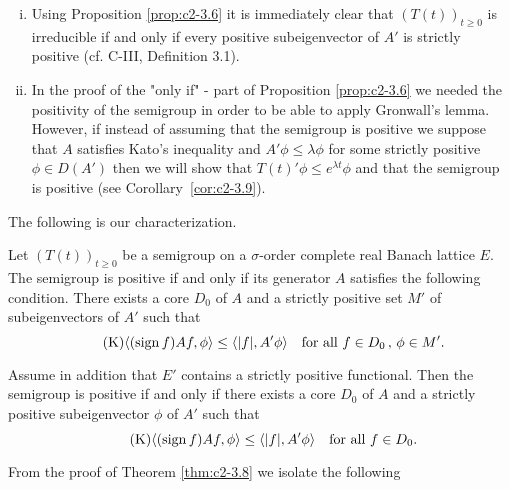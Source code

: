 \begin{remark}\label{rem:c2-3.7}
\begin{enumerate}[(i)]
\item \label{rem:c2-3.7-1}
Using Proposition \ref{prop:c2-3.6} it is immediately clear that
$(T(t))_{t \geq 0}$ is irreducible if and only if every positive subeigenvector
of $A'$ is strictly positive (cf. C-III, Definition 3.1).
\item \label{rem:c2-3.7-2}
In the proof of the "only if" - part of Proposition \ref{prop:c2-3.6} we needed the
positivity of the semigroup in order to be able to apply Gronwall's
lemma.
However, if instead of assuming that the semigroup is positive
we suppose that $A$ satisfies Kato's inequality and $A'\phi \leq \lambda\phi$ for some strictly positive $\phi \in D(A')$ then we will show that $T(t)'\phi \leq
e^{\lambda t} \phi$ and that the semigroup is positive (see Corollary~\ref{cor:c2-3.9}).
\end{enumerate}
\end{remark}

The following is our characterization.

\begin{theorem}\label{thm:c2-3.8}
Let $(T(t))_{t \geq 0}$ be a semigroup on a $\sigma$-order complete
real Banach lattice $E$. The semigroup is positive if and only if its
generator $A$ satisfies the following condition.
There exists a core $D_{0}$ of $A$ and a strictly positive set $M'$ of
subeigenvectors of $A'$ such that
\begin{equation}\label{eq:c2-K4} \tag{K}
\langle(\operatorname{sign} f) Af,\phi \rangle \leq \langle|f|,A'\phi\rangle \quad \text{for all } f \in D_{0} \, , \, \phi \in M'.
\end{equation}
\end{theorem}
\begin{corollary}\label{cor:c2-3.9}
Assume in addition that $E'$ contains a strictly positive functional. 
Then the semigroup is positive if and only if there
exists a core $D_{0}$ of $A$ and a strictly positive subeigenvector $\phi$
of $A'$ such that
\begin{equation}\label{eq:c2-K5} \tag{K}
\langle(\operatorname{sign} f) Af,\phi \rangle \leq \langle|f|,A'\phi\rangle \quad \text{for all } f \in D_{0}.
\end{equation}
\end{corollary}

From the proof of Theorem \ref{thm:c2-3.8}   we isolate the following

